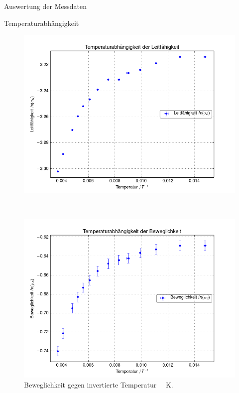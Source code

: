 \documentclass[pdftex, a4paper,11pt, twoside, ngerman]{report}
\begin{document}
\begin{chapter}{Auswertung der Messdaten}
\begin{section}{Temperaturabhängigkeit}
      \begin{figure}[ht!]
        \centering
        \begin{minipage}{.92\textwidth}
          \centering
          \includegraphics[width=\textwidth]{Figures/Temp_Leitfaehigkeit.png}
          \caption{Leitfähigkeit gegen invertierte Temperatur
              \SI{}{\per\kelvin}.}
          \label{fig:TempLeifaehigkeit}
        \end{minipage}\\
        \begin{minipage}{.92\textwidth}
          \centering
          \includegraphics[width=\textwidth]{Figures/Temp_Beweglichkeit.png}
          \caption{Beweglichkeit gegen invertierte Temperatur
              \SI{}{\per\kelvin}.}
          \label{fig:TempBeweglichkeit}
        \end{minipage}
      \end{figure}
      

\end{section}
\end{chapter}
\end{document}
